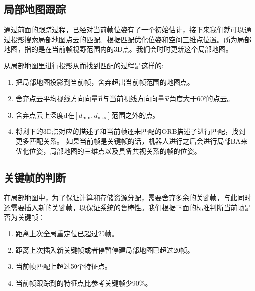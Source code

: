 \subsection{局部地图跟踪}
通过前面的跟踪过程，已经对当前帧位姿有了一个初始估计，接下来我们就可以通过投影搜索局部地图点云的匹配。根据匹配优化位姿和空间三维点位置。所为局部地图，指的是在当前帧视野范围内的3D点。我们会时时更新这个局部地图。\par
从局部地图里进行投影从而找到匹配的过程是这样的:
\begin{enumerate}
\item 把局部地图投影到当前帧，舍弃超出当前帧范围的地图点。
\item 舍弃点云平均视线方向向量$\overrightarrow{\mathbf{n}}$与当前视线方向向量$\overrightarrow{\mathbf{v}}$角度大于60°的点云。
\item 舍弃点云上深度d在$\left[d_{\min }, d_{\max }\right]$范围之外的点。
\item 将剩下的3D点对应的描述子和当前帧还未匹配的ORB描述子进行匹配，找到更多匹配关系。
如果当前帧是关键帧的话，机器人进行之后会进行局部BA来优化位姿，局部地图的三维点以及具备共视关系的帧的位姿。
\end{enumerate}
\subsection{关键帧的判断}
在局部地图中，为了保证计算和存储资源分配，需要舍弃多余的关键帧，与此同时还需要插入新的关键帧，以保证系统的鲁棒性。我们根据下面的标准判断当前帧是否为关键帧：\par
\begin{enumerate}
\item 距离上次全局重定位已超过20帧。
\item 距离上次插入新关键帧或者停暂停建局部地图已超过20帧。
\item 当前帧匹配上超过50个特征点。
\item 当前帧跟踪到的特征点比参考关键帧少90\%。
\end{enumerate}
